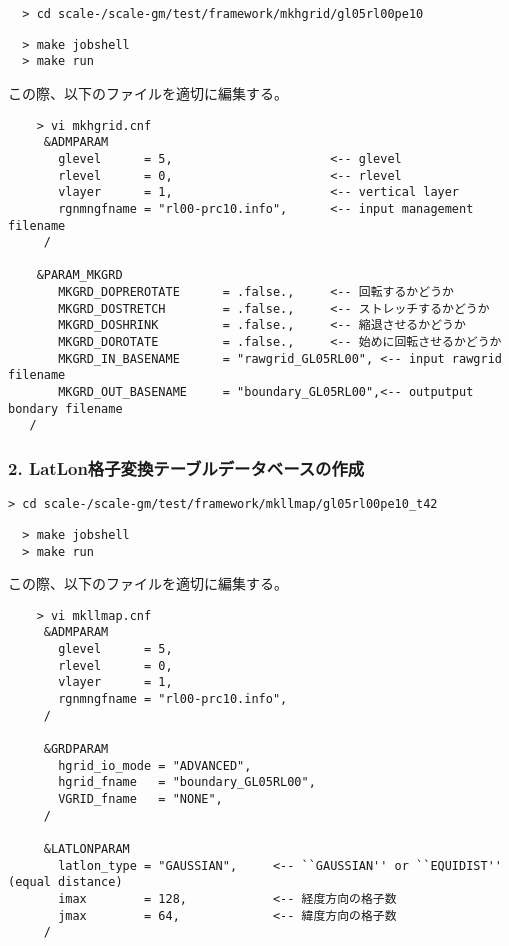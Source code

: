 \begin{enumerate}
\verb|  > cd scale-|{\version}\verb|/scale-gm/test/framework/mkhgrid/gl05rl00pe10|
\vspace{-4mm}
\begin{verbatim}
  > make jobshell
  > make run
\end{verbatim}
 この際、以下のファイルを適切に編集する。
 \begin{verbatim}
    > vi mkhgrid.cnf
     &ADMPARAM
       glevel      = 5,                      <-- glevel
       rlevel      = 0,                      <-- rlevel
       vlayer      = 1,                      <-- vertical layer
       rgnmngfname = "rl00-prc10.info",      <-- input management filename
     /

    &PARAM_MKGRD
       MKGRD_DOPREROTATE      = .false.,     <-- 回転するかどうか
       MKGRD_DOSTRETCH        = .false.,     <-- ストレッチするかどうか
       MKGRD_DOSHRINK         = .false.,     <-- 縮退させるかどうか
       MKGRD_DOROTATE         = .false.,     <-- 始めに回転させるかどうか
       MKGRD_IN_BASENAME      = "rawgrid_GL05RL00", <-- input rawgrid filename
       MKGRD_OUT_BASENAME     = "boundary_GL05RL00",<-- outputput bondary filename
   /
\end{verbatim}
\end{enumerate}

\subsubsection{2. LatLon格子変換テーブルデータベースの作成}

\verb|> cd scale-|{\version}\verb|/scale-gm/test/framework/mkllmap/gl05rl00pe10_t42|
\vspace{-3mm}
\begin{verbatim}
  > make jobshell
  > make run
\end{verbatim}
 この際、以下のファイルを適切に編集する。
 \begin{verbatim}
    > vi mkllmap.cnf
     &ADMPARAM
       glevel      = 5,
       rlevel      = 0,
       vlayer      = 1,
       rgnmngfname = "rl00-prc10.info",
     /

     &GRDPARAM
       hgrid_io_mode = "ADVANCED",
       hgrid_fname   = "boundary_GL05RL00",
       VGRID_fname   = "NONE",
     /

     &LATLONPARAM
       latlon_type = "GAUSSIAN",     <-- ``GAUSSIAN'' or ``EQUIDIST'' (equal distance)
       imax        = 128,            <-- 経度方向の格子数
       jmax        = 64,             <-- 緯度方向の格子数
     /
 \end{verbatim}



